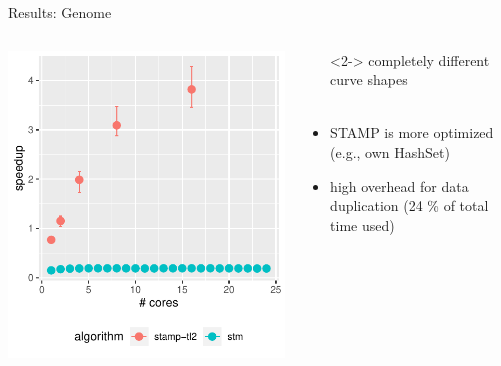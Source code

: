 \documentclass[aspectratio=169, usenames, dvipsnames]{beamer}
\newcommand{\xmark}{\ding{55}}%
\newcommand{\nope}{\rlap{$\square$}{\large\hspace{1pt}\xmark}%
\hspace{-2.5pt}}
\begin{document}
\begin{frame}{Results: Genome}
    \begin{columns}%
        \begin{column}{0.5\textwidth}
            \centering
            \includegraphics[width=\textwidth,height=.65\textheight,keepaspectratio]{img/combined_plots/genome++}
        \end{column}%
        \begin{column}{0.5\textwidth}
            \begin{itemize}
                \item[\nope]<2-> completely different curve shapes\\ \ 
            \end{itemize}

            \begin{itemize}
                \item<3-> STAMP is more optimized \\ (e.g., own HashSet)
                \item<4-> high overhead for data duplication (24 \% of total time used)
            \end{itemize}
        \end{column}
    \end{columns}
\end{frame}
\end{document}
